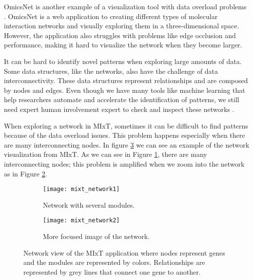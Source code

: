 OmicsNet is another example of a visualization tool with data overload problems \cite{omnicsnet}. OmicsNet is a web application to creating different types of molecular interaction networks and visually exploring them in a three-dimensional space. However, the application also struggles with problems like edge occlusion and performance, making it hard to visualize the network when they become larger.

It can be hard to identify novel patterns when exploring large amounts of data. Some data structures, like the networks, also have the challenge of data interconnectivity. These data structures represent relationships and are composed by nodes and edges. Even though we have many tools like machine learning that help researchers automate and accelerate the identification of patterns, we still need expert human involvement expert to check and inspect these networks \cite{network_expert}.

When exploring a network in MIxT, sometimes it can be difficult to find patterns because of the data overload issues. This problem happens especially when there are many interconnecting nodes. In figure \ref{fig:mixt_network} we can see an example of the network visualization from MIxT. As we can see in Figure \ref{fig:mixt_network1}, there are many interconnecting nodes; this problem is amplified when we zoom into the network as in Figure \ref{fig:mixt_network_zoom}.

\begin{figure}[h!]
    \centering%
    \begin{subfigure}[t]{0.5\textwidth}
        \centering%
        \texttt{[image: mixt\_network1]}
        \caption{Network with several modules.}
        \label{fig:mixt_network1}
    \end{subfigure}%
    \begin{subfigure}[t]{0.5\textwidth}
        \centering%
        \texttt{[image: mixt\_network2]}
        \caption{More focused image of the network.}
        \label{fig:mixt_network_zoom}
    \end{subfigure}

    \caption{Network view of the MIxT application where nodes represent genes and the modules are represented by colors. Relationships are represented by grey lines that connect one gene to another.}
    \label{fig:mixt_network}
\end{figure}


